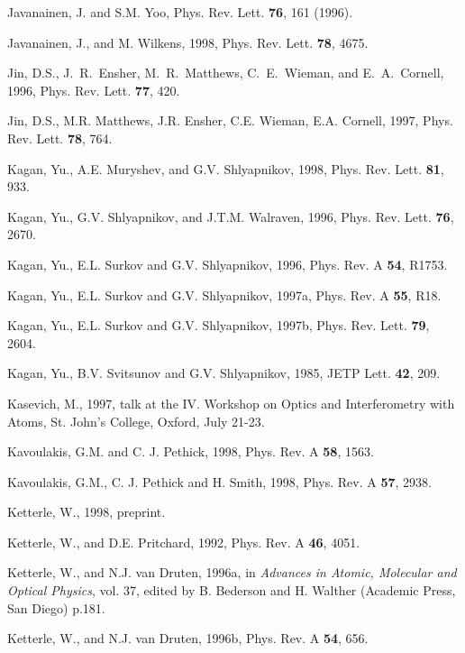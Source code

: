 \begin{references}
 Javanainen, J. and S.M. Yoo, Phys. Rev. Lett.
{\bf 76}, 161 (1996).

 Javanainen, J., and M. Wilkens, 1998, Phys. Rev. Lett. 
{\bf 78}, 4675. 

      Jin, D.S., J.\ R.\ Ensher, M.\ R.\ Matthews, C.\
E.\ Wieman, and E.\ A.\ Cornell, 1996, Phys. Rev. Lett. {\bf 77}, 420.

      Jin, D.S., M.R. Matthews, J.R. Ensher, C.E. Wieman,
E.A. Cornell, 1997, Phys. Rev. Lett. {\bf 78}, 764.

    Kagan, Yu., A.E. Muryshev, and G.V. Shlyapnikov,
1998, Phys. Rev. Lett. {\bf 81}, 933.

   Kagan, Yu., G.V. Shlyapnikov, and J.T.M. Walraven,
1996, Phys. Rev. Lett. {\bf 76}, 2670.

   Kagan, Yu., E.L. Surkov and G.V. Shlyapnikov, 1996,
Phys. Rev. A {\bf 54}, R1753.

   Kagan, Yu., E.L. Surkov and  G.V. Shlyapnikov,
1997a, Phys. Rev. A {\bf 55}, R18.

   Kagan, Yu., E.L. Surkov and  G.V. Shlyapnikov,
1997b, Phys. Rev. Lett. {\bf 79}, 2604.

     Kagan, Yu., B.V. Svitsunov and G.V. Shlyapnikov, 
1985, JETP Lett. {\bf 42}, 209.

 Kasevich, M., 1997, talk at the IV. Workshop on
Optics and Interferometry with Atoms, St. John's College, Oxford, July
21-23.

 Kavoulakis, G.M. and C. J. Pethick, 
1998, Phys. Rev. A {\bf 58}, 1563.

 Kavoulakis, G.M., C. J. Pethick and
H. Smith, 1998, Phys. Rev. A {\bf 57}, 2938.

   Ketterle, W., 1998, preprint. 

 Ketterle, W., and D.E. Pritchard, 1992, Phys. Rev.
A {\bf 46}, 4051.

 Ketterle, W., and N.J. van Druten, 1996a, in {\it 
Advances in Atomic, Molecular and Optical Physics}, vol. 37, edited by 
B. Bederson and H. Walther (Academic Press, San Diego) p.181.

 Ketterle, W., and N.J. van Druten, 1996b, Phys. Rev.
A {\bf 54}, 656.


\end{references}
